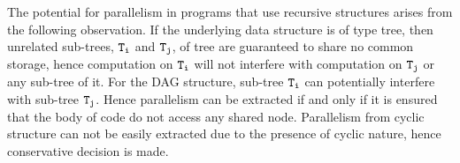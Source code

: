 The potential for parallelism in programs that use recursive structures arises from the following observation. If the underlying data structure is of type tree, then unrelated sub-trees, ${\tt T_i}$ and ${\tt T_j}$, of tree  are guaranteed to share no common storage, hence computation on ${\tt T_i}$ will not interfere with computation on ${\tt T_j}$ or any sub-tree of it. For the DAG structure, sub-tree ${\tt T_i}$ can potentially interfere with sub-tree ${\tt T_j}$. Hence parallelism can be extracted if and only if it is ensured that the body of code do not access any shared node. Parallelism from cyclic structure can not be easily extracted due to the presence of cyclic nature, hence conservative decision is made. 
%



